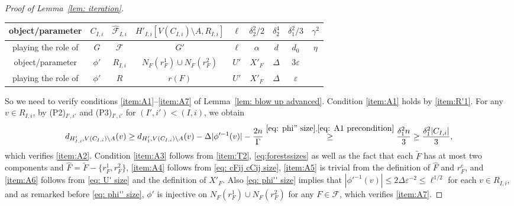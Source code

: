 \documentclass[a4paper, 11pt, reqno]{amsart}
\numberwithin{equation}{section}
\newcommand{\1}{{\rm 1\hspace*{-0.4ex}%
\rule{0.1ex}{1.52ex}\hspace*{0.2ex}}}
\newcommand{\cF}{\mathcal{F}}
\newcommand{\I}{I}
\renewcommand{\epsilon}{\varepsilon}
\newcommand{\sm}{\setminus}
\newcommand{\sub}{\subseteq}
\newcommand{\COMMENT}[1]{}
\begin{document}
\begin{proof}[Proof of Lemma~\ref{lem: iteration}]
\noindent
{
\begin{tabular}{c|c|c|c|c|c|c|c|c}
object/parameter & $C_{{\I},i}$& $\hat{\cF}_{{\I},i}$ & $H'_{{\I},i}[V(C_{I,i})\sm A, R_{I,i}]$ &  $\ell$ & $\delta_2^2/2$ &$\delta_2^4$ & $\delta_1^2/3$& $\gamma^2$  
\\ \hline
playing the role of & $G$ &$\cF$ &$G'$ &$\ell$ & $\alpha$ & $d$ & $d_0$ & $\eta$ 
\\ \hline \hline
object/parameter  & $\phi'$ & $R_{{\I},i}$ & $N_{F}(r^1_F)\cup N_{F}(r^2_F)$ & $U'$ & $X'_F$ & $\Delta$& $3\epsilon$ 
\\ \hline
playing the role of  & $\phi'$& $R$& $r(F)$ & $U'$ & $X'_F$ & $\Delta$ & $\epsilon$
\end{tabular}
}\newline \vspace{0.2cm}

\noindent
So we need to verify conditions \ref{item:A1}--\ref{item:A7} of Lemma~\ref{lem: blow up advanced}.
Condition \ref{item:A1} holds by \ref{item:R'1}.
For any $v\in R_{\I,i}$, by (P2)$_{\I',i'}$ and (P3)$_{\I',i'}$ for $(\I',i')<(\I,i)$,\COMMENT{Actually, subtracting $2n/\Gamma$ below is not necessary since 2. neighbours of roots $r_F^1,r_F^2$ will always be mapped to vertices in $V\sm A$
(since $R_{\I,i}\sub A$ and $H_1$ is bipartite) and so no vertex in $R_{\I,i}$ can ever be an image of such a second neighbour of a root.}
we obtain
$$d_{H'_{{\I},i}, V(C_{{\I},i})\sm A}(v) 
\geq d_{H'_1,V(C_{{\I},i})\sm A}(v) - \Delta |\phi'^{-1}(v)| - \frac{2n}{\Gamma}
\stackrel{\eqref{eq: phi'' size},\eqref{eq: A1 precondition}}{\geq} \frac{\delta_1^2 n}{3}
\geq \frac{\delta_1^2|C_{\I,i}|}{3},$$
which verifies \ref{item:A2}.
Condition \ref{item:A3} follows from \ref{item:T2}, \eqref{eq:forestssizes} 
as well as the fact that each $\tilde{F}$ has at most two components and $\hat{F}= \tilde{F} - \{r^1_{F}, r^2_{F}\}$, 
\ref{item:A4} follows from \eqref{eq: cFij cCij size}, 
\ref{item:A5} is trivial from the definition of $\hat{F}$ and $r^c_F$, and 
\ref{item:A6} follows from \eqref{eq: U' size} and the definition of $X'_F$.
Also \eqref{eq: phi'' size} implies that $|\phi'^{-1}(v)|\leq 2\Delta\epsilon^{-2} \leq \ell^{1/2}$ 
for each $v\in R_{\I,i}$,
and as remarked before \eqref{eq: phi'' size}, $\phi'$ is injective on 
$N_F(r^1_F)\cup N_F(r^2_F)$ for any $F\in \cF$, which verifies \ref{item:A7}. 
 

\end{proof}
\end{document}
